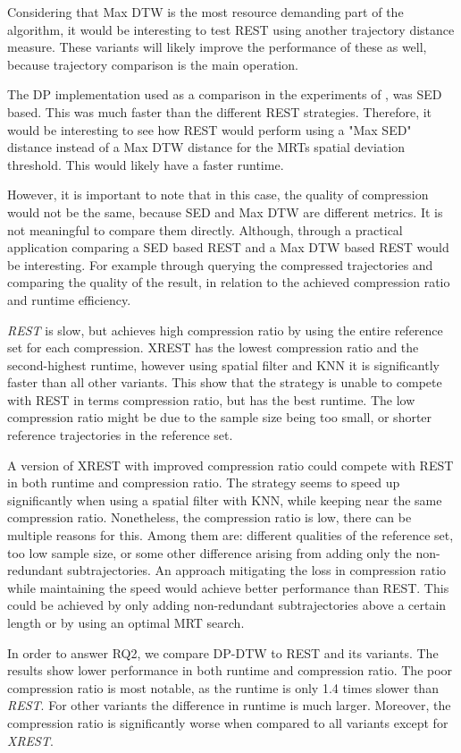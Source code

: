 Considering that Max DTW is the most resource demanding part of the algorithm, it would be interesting to test REST using another trajectory distance measure. These variants will likely improve the performance of these as well, because trajectory comparison is the main operation.

The DP implementation used as a comparison in the experiments of \textcite{zhao2018rest}, was SED based. This was much faster than the different REST strategies. Therefore, it would be interesting to see how REST would perform using a "Max SED" distance instead of a Max DTW distance for the MRTs spatial deviation threshold. This would likely have a faster runtime.

However, it is important to note that in this case, the quality of compression would not be the same, because SED and Max DTW are different metrics. It is not meaningful to compare them directly. Although, through a practical application comparing a SED based REST and a Max DTW based REST would be interesting. For example through querying the compressed trajectories and comparing the quality of the result, in relation to the achieved compression ratio and runtime efficiency.

\textit{REST} is slow, but achieves high compression ratio by using the entire reference set for each compression. XREST has the lowest compression ratio and the second-highest runtime, however using spatial filter and KNN it is significantly faster than all other variants. This show that the strategy is unable to compete with REST in terms compression ratio, but has the best runtime. The low compression ratio might be due to the sample size being too small, or shorter reference trajectories in the reference set.

A version of XREST with improved compression ratio could compete with REST in both runtime and compression ratio. The strategy seems to speed up significantly when using a spatial filter with KNN, while keeping near the same compression ratio. Nonetheless, the compression ratio is low, there can be multiple reasons for this. Among them are: different qualities of the reference set, too low sample size, or some other difference arising from adding only the non-redundant subtrajectories. An approach mitigating the loss in compression ratio while maintaining the speed would achieve better performance than REST. This could be achieved by only adding non-redundant subtrajectories above a certain length or by using an optimal MRT search.

In order to answer RQ2, we compare DP-DTW to REST and its variants. The results show lower performance in both runtime and compression ratio. The poor compression ratio is most notable, as the runtime is only 1.4 times slower than \textit{REST}. For other variants the difference in runtime is much larger. Moreover, the compression ratio is significantly worse when compared to all variants except for \textit{XREST}.


